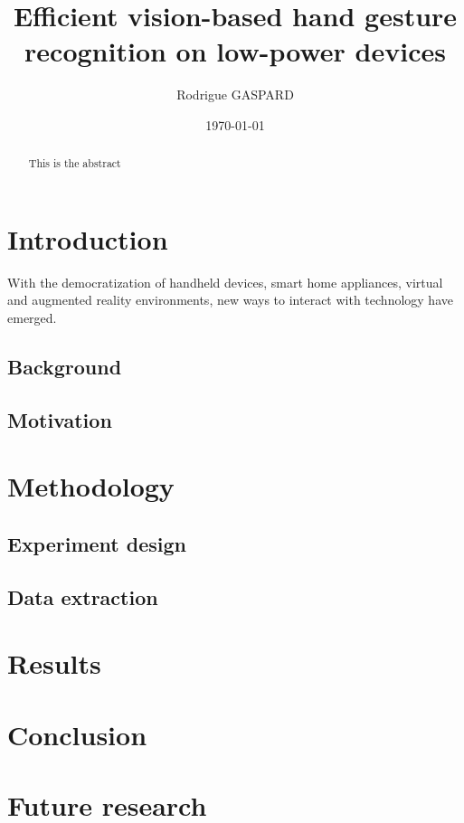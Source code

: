 \documentclass{article}
\title{Efficient vision-based hand gesture recognition on low-power devices}
\author{Rodrigue GASPARD}
\date{\today}
\begin{document}
\maketitle

\begin{abstract}
  This is the abstract
\end{abstract}

\section{Introduction}
With the democratization of handheld devices, smart home appliances,  virtual and augmented reality environments, new ways to interact with technology have emerged. 
\subsection{Background}
\subsection{Motivation}

\section{Methodology}
\subsection{Experiment design}
\subsection{Data extraction}

\section{Results}

\section{Conclusion}

\section{Future research}
\end{document}
